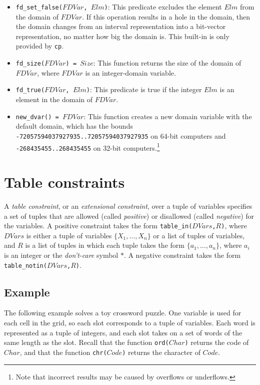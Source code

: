 \begin{itemize}
\item \texttt{fd\_set\_false($FDVar$, $Elm$)}: This predicate excludes the element $Elm$ from the domain of $FDVar$. If this operation results in a hole in the domain, then the domain changes from an interval representation into a bit-vector representation, no matter how big the domain is. This built-in is only provided by {\tt cp}.
\item \texttt{fd\_size($FDVar$) = $Size$}: This function returns the size of the domain of $FDVar$,  where $FDVar$ is an integer-domain variable.
\item \texttt{fd\_true($FDVar$, $Elm$)}: This predicate is true if the integer $Elm$ is an element in the domain of $FDVar$.
\item \texttt{new\_dvar() = $FDVar$}: This function creates a new domain variable with the default domain, which has the bounds \texttt{-72057594037927935..72057594037927935} on 64-bit computers and \texttt{-268435455..268435455} on 32-bit computers.\footnote{Note that incorrect results may be caused by overflows or underflows.}
\end{itemize}

\section{Table constraints}
A \emph{table constraint}, or an \emph{extensional constraint}, over a tuple of variables specifies a set of tuples that are allowed (called \emph{positive}) or disallowed (called \emph{negative}) for the variables. A positive constraint takes the form \texttt{table\_in($DVars$,$R$)}, where $DVars$ is either a tuple of variables $\{X_1,\ldots,X_n\}$ or a list of tuples of variables, and $R$ is a list of tuples in which each tuple takes the form $\{a_1,\ldots,a_n\}$, where $a_i$ is an integer or the \textit{don't-care} symbol $*$.  A negative constraint takes the form \texttt{table\_notin($DVars$,$R$)}.

\subsection*{Example}
The following example solves a toy crossword puzzle. One variable is used for each cell in the grid, so each slot corresponds to a tuple of variables. Each word is represented as a tuple of integers, and each slot takes on a set of words of the same length as the slot. Recall that the function \texttt{ord($Char$)} returns the code of $Char$, and that the function \texttt{chr($Code$)} returns the character of $Code$.


